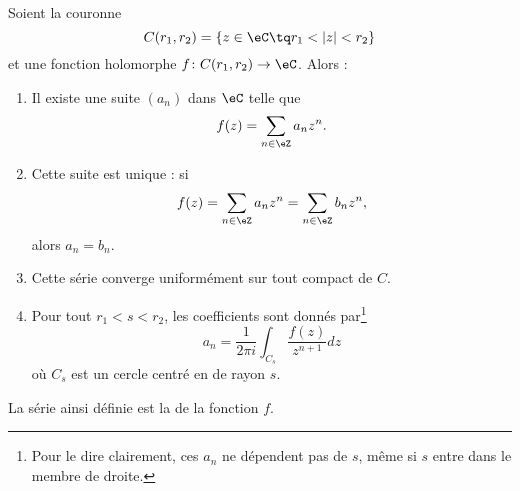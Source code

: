 \begin{theorem}       \label{THOooMKJOooVghZyG}
    Soient la couronne
    \begin{equation}
        C(r_1,r_2)=\{ z\in \eC\tq r_1<| z |<r_2 \}
    \end{equation}
    et une fonction holomorphe \( f\colon C(r_1,r_2)\to \eC\). Alors : 
    \begin{enumerate}
        \item
    Il existe une suite \( (a_n) \) dans \( \eC\) telle que
    \begin{equation}
        f(z)=\sum_{n\in \eZ}a_nz^n.
    \end{equation}
\item       \label{ITEMooUOPHooSJRGKs}
    Cette suite est unique : si 
    \begin{equation}
        f(z)=\sum_{n\in \eZ}a_nz^n=\sum_{n\in \eZ}b_nz^n,
    \end{equation}
    alors \( a_n=b_n\).
\item       \label{ITEMooOYCPooZZAyKs}
            Cette série converge uniformément sur tout compact de \( C\).
        \item
            Pour tout \( r_1<s<r_2\), les coefficients sont donnés par\footnote{Pour le dire clairement, ces \( a_n\) ne dépendent pas de \( s\), même si \( s\) entre dans le membre de droite.}
            \begin{equation}
                a_n=\frac{1}{ 2\pi i }\int_{C_s}\frac{ f(z) }{ z^{n+1} }dz
            \end{equation}
            où \( C_s\) est un cercle centré en de rayon \( s\). 
    \end{enumerate}
    La série ainsi définie est la  de la fonction \( f\).
\end{theorem}

